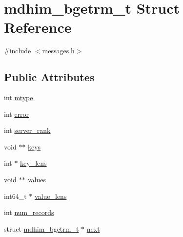 \hypertarget{structmdhim__bgetrm__t}{\section{mdhim\-\_\-bgetrm\-\_\-t Struct Reference}
\label{d0/d48/structmdhim__bgetrm__t}
}


{\ttfamily \#include $<$messages.\-h$>$}

\subsection*{Public Attributes}
\begin{DoxyCompactItemize}
\item 
int \hyperlink{structmdhim__bgetrm__t_a6d1d78bcd4d55f5341f543246a7636c6}{mtype}
\item 
int \hyperlink{structmdhim__bgetrm__t_a42d5a4b81bd9817f4c31348525d53e37}{error}
\item 
int \hyperlink{structmdhim__bgetrm__t_a3113667adc0eafe85d22c273766bce7f}{server\-\_\-rank}
\item 
void $\ast$$\ast$ \hyperlink{structmdhim__bgetrm__t_adb7029ca1238649fc6b838e21dc1e1fc}{keys}
\item 
int $\ast$ \hyperlink{structmdhim__bgetrm__t_a4edb37ec3da3413607e3eeda3f224525}{key\-\_\-lens}
\item 
void $\ast$$\ast$ \hyperlink{structmdhim__bgetrm__t_a322850d7fda46b0c170ca98342a81779}{values}
\item 
int64\-\_\-t $\ast$ \hyperlink{structmdhim__bgetrm__t_a689b35993bf4fbe82b9934ba760ca7df}{value\-\_\-lens}
\item 
int \hyperlink{structmdhim__bgetrm__t_a3d398b31f450603e67b854ab563180e8}{num\-\_\-records}
\item 
struct \hyperlink{structmdhim__bgetrm__t}{mdhim\-\_\-bgetrm\-\_\-t} $\ast$ \hyperlink{structmdhim__bgetrm__t_aeb24801d3c8827a0ca7611312e28e568}{next}
\end{DoxyCompactItemize}


